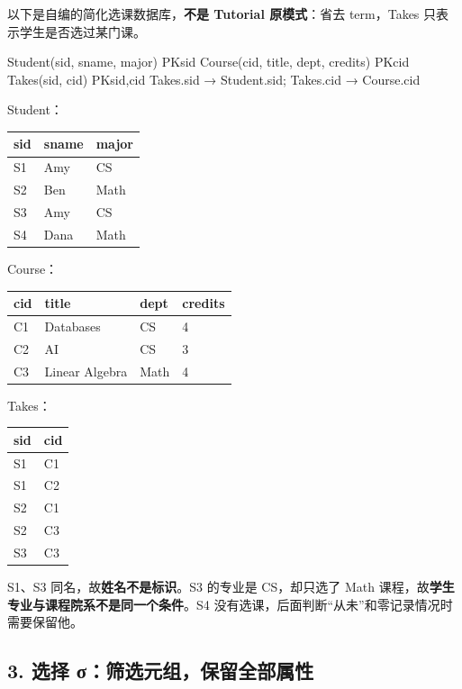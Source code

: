 以下是自编的简化选课数据库，\textbf{不是 Tutorial 原模式}：省去 term，Takes 只表示学生是否选过某门课。

\begin{StudyCode}
Student(sid, sname, major)          PK{sid}
Course(cid, title, dept, credits)   PK{cid}
Takes(sid, cid)                    PK{sid,cid}
Takes.sid → Student.sid; Takes.cid → Course.cid
\end{StudyCode}

Student：

\begin{longtable}[]{@{}lll@{}}
\toprule\noalign{}
sid & sname & major \\
\midrule\noalign{}
\endhead
\bottomrule\noalign{}
\endlastfoot
S1 & Amy & CS \\
S2 & Ben & Math \\
S3 & Amy & CS \\
S4 & Dana & Math \\
\end{longtable}

Course：

\begin{longtable}[]{@{}llll@{}}
\toprule\noalign{}
cid & title & dept & credits \\
\midrule\noalign{}
\endhead
\bottomrule\noalign{}
\endlastfoot
C1 & Databases & CS & 4 \\
C2 & AI & CS & 3 \\
C3 & Linear Algebra & Math & 4 \\
\end{longtable}

Takes：

\begin{longtable}[]{@{}ll@{}}
\toprule\noalign{}
sid & cid \\
\midrule\noalign{}
\endhead
\bottomrule\noalign{}
\endlastfoot
S1 & C1 \\
S1 & C2 \\
S2 & C1 \\
S2 & C3 \\
S3 & C3 \\
\end{longtable}

S1、S3 同名，故\textbf{姓名不是标识}。S3 的专业是 CS，却只选了 Math 课程，故\textbf{学生专业与课程院系不是同一个条件}。S4 没有选课，后面判断``从未''和零记录情况时需要保留他。

\Needspace{11cm}
\subsection{3. 选择 σ：筛选元组，保留全部属性}\label{05_relational_algebra_zh-ux9009ux62e9-ux3c3ux7b5bux9009ux5143ux7ec4ux4fddux7559ux5168ux90e8ux5c5eux6027}

